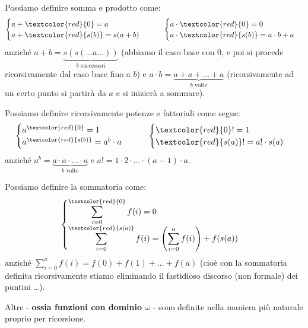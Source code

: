 \documentclass[11pt]{scrartcl}
\begin{document}
\begin{example}
	Possiamo definire somma e prodotto come:
	\[ \begin{cases}
		a + \textcolor{red}{0} = a \\
		a + \textcolor{red}{s(b)} = s(a + b)
	\end{cases}
	\qquad
	\begin{cases}
		a \cdot \textcolor{red}{0} = 0\\
		a \cdot \textcolor{red}{s(b)} = a \cdot b + a
	\end{cases}
		\]
	anziché $a + b = \underbrace{s(s(\ldots a \ldots))}_{\text{$b$ successori}}$ (abbiamo il caso base con 0, e poi si procede ricorsivamente dal caso base fino a $b$) e $a \cdot b = \underbrace{a + a + \ldots + a}_{\text{$b$ volte}}$ (ricorsivamente ad un certo 
	punto si partirà da $a$ e si inizierà a sommare).
\end{example}

\begin{example}
	Possiamo definire ricorsivamente potenze e fattoriali come segue:
	\[ \begin{cases}
		a^{\textcolor{red}{0}} = 1\\
		a^{\textcolor{red}{s(b)}} = a^b \cdot a
	\end{cases}
	\qquad
	\begin{cases}
		\textcolor{red}{0}! = 1\\
		\textcolor{red}{s(a)}! = a! \cdot s(a)
	\end{cases}
		\]
	anziché $a^b = \underbrace{a \cdot a \cdot \ldots \cdot a}_{\text{$b$ volte}}$ e $a! = 1 \cdot 2 \cdot \ldots \cdot (a - 1) \cdot a$.
\end{example}

\begin{example}
	[Sommatoria]
	Possiamo definire la sommatoria come:
	\[\begin{cases}
		\displaystyle
		\sum_{i = 0}^{\textcolor{red}{0}} f(i) = 0\\
		\displaystyle
		\sum_{i = 0}^{\textcolor{red}{s(a)}} f(i) = \left(\sum_{i=0}^{a} f(i) \right) + f(s(a))
	\end{cases}
		\]
	anziché $\displaystyle\sum_{i = 0}^a f(i) = f(0) + f(1) + \ldots + f(a)$ (cioè con la sommatoria definita ricorsivamente stiamo eliminando il fastidioso discorso (non formale) dei puntini \dots).
\end{example}

Altre  - \textbf{ossia funzioni con dominio $\omega$} - sono definite nella maniera più naturale proprio per ricorsione.
\end{document}
